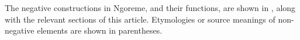 \documentclass[output=paper,colorlinks,citecolor=brown,draftmode]{langscibook}
\begin{document}
The negative constructions in Ngoreme, and their functions, are shown in , along with the relevant sections of this article. Etymologies or source meanings of non-negative elements are shown in parentheses.
%
\end{document}

